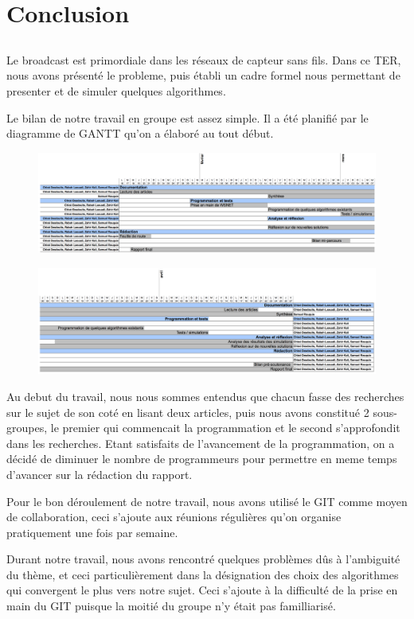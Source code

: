 \chapter{Conclusion}\label{conclusion}

\section{}
Le broadcast est primordiale dans les réseaux de capteur sans fils. Dans ce TER, nous avons présenté le probleme, puis établi un cadre 
formel nous permettant de presenter et de simuler quelques algorithmes. 



Le bilan de notre travail en groupe est assez simple. Il a été planifié par le diagramme de GANTT qu'on a élaboré au tout début.

\begin{landscape}

\begin{figure}
\centering
\includegraphics[scale=0.98]{Conclusion/diagramme}
\end{figure}

\begin{figure}
\centering
\includegraphics[scale=0.98]{Conclusion/diagramme2}
\end{figure}

\end{landscape}

Au debut du travail, nous nous sommes entendus que chacun fasse des recherches sur le sujet de son coté en lisant 
deux articles, puis nous avons constitué 2 sous-groupes, le premier qui commencait la programmation et le second 
s'approfondit dans les recherches. Etant satisfaits de l'avancement de la programmation, on a décidé de diminuer 
le nombre de programmeurs pour permettre en meme temps d'avancer sur la rédaction du rapport.

Pour le bon déroulement de notre travail, nous avons utilisé le GIT comme moyen de collaboration, ceci s'ajoute 
aux réunions régulières qu'on organise pratiquement une fois par semaine.

Durant notre travail, nous avons rencontré quelques problèmes dûs à l'ambiguité du thème, et ceci particulièrement
dans la désignation des choix des algorithmes qui convergent le plus vers notre sujet. Ceci s'ajoute à la difficulté 
de la prise en main du GIT puisque la moitié du groupe n'y était pas familliarisé.